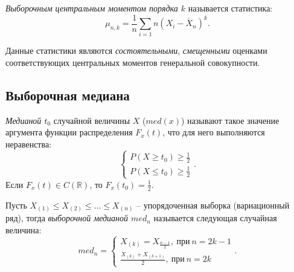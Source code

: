 \begin{definition}
  \textit{Выборочным центральным моментом порядка $k$} называется статистика:
  \[
    \mu_{n, k} = \frac{1}{n} \sum\limits_{i = 1}{n} (X_i - \overline{X}_n)^k
  .\]
\end{definition}

Данные статистики являются \textit{состоятельными}, \textit{смещенными} оценками
соответствующих центральных моментов генеральной совокупности.



\subsection{Выборочная медиана}

\begin{definition}
  \textit{Медианой $t_0$} случайной величины $X$ ($med(x)$) называют такое значение
  аргумента функции распределения $F_x(t)$, что для него выполняются
  неравенства:
  \[
    \begin{cases}
      P(X \geqslant t_0) \geqslant \frac{1}{2}\\
      P(X \leqslant t_0) \geqslant \frac{1}{2}
    \end{cases}
  .\]
  Если $F_x(t) \in C(\mathbb{R})$, то $F_x(t_0) = \frac{1}{2}$.
\end{definition}

\begin{definition}
  Пусть $X_{(1)} \leqslant X_{(2)} \leqslant \ldots \leqslant X_{(n)}$ --
  упорядоченная выборка (вариационный ряд), тогда \textit{выборочной медианой
  $med_n$} называется следующая случайная величина:
  \[
    med_n = \begin{cases}
      X_{(k)} = X_{\frac{n - 1}{2}},~ \text{при}~ n = 2k - 1\\
      \frac{X_{(k)} + X_{(k + 1)}}{2},~ \text{при}~ n = 2k
    \end{cases}
  .\]
\end{definition}

